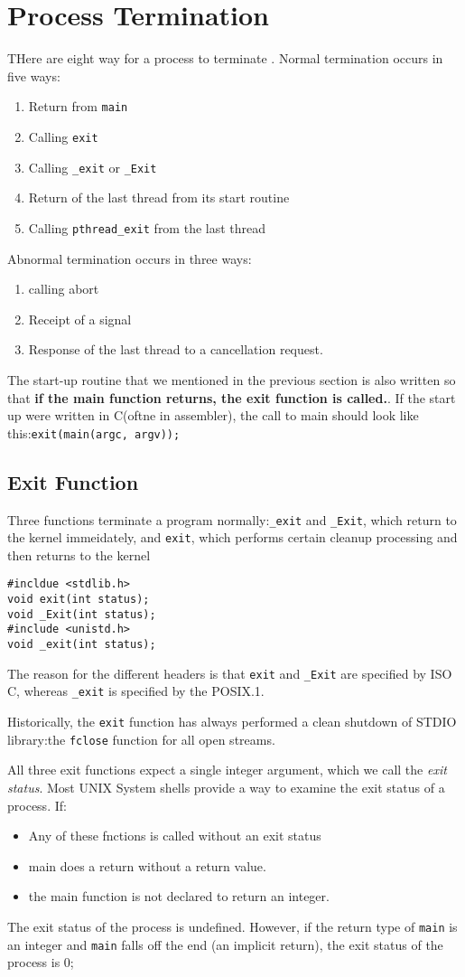 \documentclass[a4paper,10pt]{book}
\begin{document}
\section{Process Termination}
THere are eight way for a process to terminate . Normal termination occurs in
five ways:
\begin{enumerate}
\item Return from \verb|main|
\item Calling \verb|exit|
\item Calling \verb|_exit| or \verb|_Exit|
\item Return of the last thread from its start routine
\item Calling \verb|pthread_exit| from the last thread
\end{enumerate}
Abnormal termination occurs in three ways:
\begin{enumerate}
\item calling abort
\item Receipt of a signal
\item Response of the last thread to a cancellation request.
\end{enumerate}
The start-up routine that we mentioned in the previous section is also written
so that \textbf{if the main function returns, the exit function is
called.}. If the start up were written in C(oftne in assembler), the call to
main should look like this:\verb|exit(main(argc, argv));|
\subsection{Exit Function}
Three functions terminate a program normally:\verb|_exit| and \verb|_Exit|,
which return to the kernel immeidately, and \verb|exit|, which performs certain
cleanup processing and then returns to the kernel
\begin{verbatim}
#incldue <stdlib.h>
void exit(int status);
void _Exit(int status);
#include <unistd.h>
void _exit(int status);
\end{verbatim}
The reason for the different headers is that \verb|exit| and \verb|_Exit| are
specified by ISO C, whereas \verb|_exit| is specified by the POSIX.1.

Historically, the \verb|exit| function has always performed a clean shutdown of
STDIO library:the \verb|fclose| function for all open streams.

All three exit functions expect a single integer argument, which we call the
\emph{exit status}. Most UNIX System shells provide a way to examine the exit
status of a process. If:
\begin{itemize}
\item Any of these fnctions is called without an exit status
\item main does a return without a return value.
\item the main function is not declared to return an integer.
\end{itemize}
The exit status of the process is undefined. However, if the return type of
\verb|main| is an integer and \verb|main| falls off the end (an implicit
return), the exit status of the process is 0;
\end{document}
